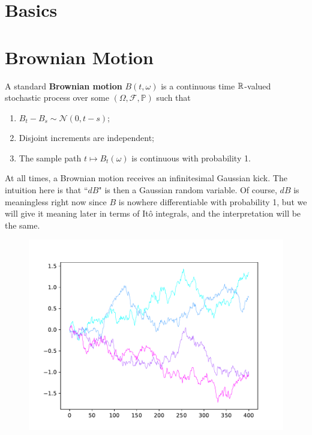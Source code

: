 \documentclass[twoside,10pt]{report}
\begin{document}


\chapter{Basics}




\chapter{Brownian Motion}

\begin{defn}[]
A standard \textbf{Brownian motion} $B(t,\omega)$ is a continuous time $\mathbb{R}$-valued stochastic process over some $(\Omega,\mathcal{F},\mathbb{P})$ such that
\begin{enumerate}
	\item $B_{t}-B_{s}\sim \mathcal{N}(0, t-s)$;
	\item Disjoint increments are independent;
	\item The sample path $t \mapsto B_{t}(\omega)$ is continuous with probability 1.
\end{enumerate}
\end{defn}

At all times, a Brownian motion receives an infinitesimal Gaussian kick. The intuition here is that ``$dB$" is then a Gaussian random variable. Of course, $dB$ is meaningless right now since $B$ is nowhere differentiable with probability 1, but we will give it meaning later in terms of It\^o integrals, and the interpretation will be the same.

\begin{figure}[H]
	\centering
	\includegraphics[scale=0.7]{fig/brownian.pdf}
\end{figure}
\end{document}
